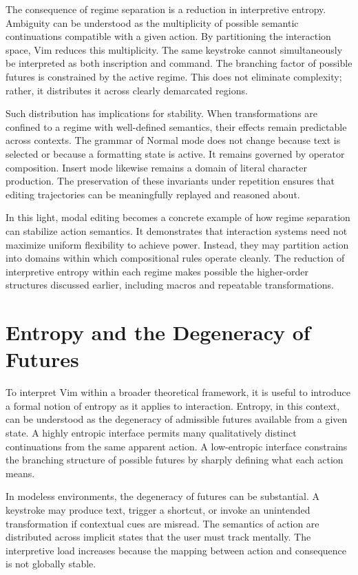 \documentclass[12pt]{article}
\begin{document}
The consequence of regime separation is a reduction in interpretive entropy. Ambiguity can be understood as the multiplicity of possible semantic continuations compatible with a given action. By partitioning the interaction space, Vim reduces this multiplicity. The same keystroke cannot simultaneously be interpreted as both inscription and command. The branching factor of possible futures is constrained by the active regime. This does not eliminate complexity; rather, it distributes it across clearly demarcated regions.

Such distribution has implications for stability. When transformations are confined to a regime with well-defined semantics, their effects remain predictable across contexts. The grammar of Normal mode does not change because text is selected or because a formatting state is active. It remains governed by operator composition. Insert mode likewise remains a domain of literal character production. The preservation of these invariants under repetition ensures that editing trajectories can be meaningfully replayed and reasoned about.

In this light, modal editing becomes a concrete example of how regime separation can stabilize action semantics. It demonstrates that interaction systems need not maximize uniform flexibility to achieve power. Instead, they may partition action into domains within which compositional rules operate cleanly. The reduction of interpretive entropy within each regime makes possible the higher-order structures discussed earlier, including macros and repeatable transformations.

\section{Entropy and the Degeneracy of Futures}

To interpret Vim within a broader theoretical framework, it is useful to introduce a formal notion of entropy as it applies to interaction. Entropy, in this context, can be understood as the degeneracy of admissible futures available from a given state. A highly entropic interface permits many qualitatively distinct continuations from the same apparent action. A low-entropic interface constrains the branching structure of possible futures by sharply defining what each action means.

In modeless environments, the degeneracy of futures can be substantial. A keystroke may produce text, trigger a shortcut, or invoke an unintended transformation if contextual cues are misread. The semantics of action are distributed across implicit states that the user must track mentally. The interpretive load increases because the mapping between action and consequence is not globally stable.
\end{document}
